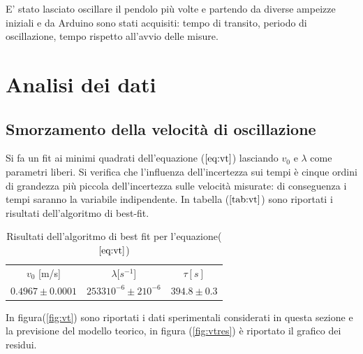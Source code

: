 \documentclass{article}
\begin{document}
E' stato lasciato oscillare il pendolo più volte e partendo da diverse ampeizze iniziali e da Arduino sono stati acquisiti: tempo di transito, periodo di oscillazione, tempo rispetto all'avvio delle misure.





\section{Analisi dei dati}

\subsection{Smorzamento della velocità di oscillazione}
\label{sez:vt}

Si fa un fit ai minimi quadrati dell'equazione ($\ref{eq:vt}$) lasciando $v_0$ e $\lambda$ come parametri liberi.
Si verifica che l'influenza dell'incertezza sui tempi è cinque ordini di grandezza più piccola dell'incertezza sulle velocità misurate: di conseguenza i tempi saranno la variabile indipendente.
In tabella ($\ref{tab:vt}$) sono riportati i risultati dell'algoritmo di best-fit.

\begin{table}[h!]
		\centering
		\begin{tabular}{|ccc|}
			\hline

			$v_0$ [m/s] &  $\lambda [s^{-1}$] & $\tau[s]$ 	\\
			$0.4967 \pm 0.0001$	 & 	$2533 10^{-6} \pm 2 10^{-6}$ 	& $394.8\pm0.3$\\
			\hline
			
		\end{tabular}
		
		\label{tab:vt}	
		\caption{Risultati dell'algoritmo di best fit per l'equazione($\ref{eq:vt}$)} 
\end{table}

In figura(\ref{fig:vt}) sono riportati i dati sperimentali considerati in questa sezione e la previsione del modello teorico, in figura (\ref{fig:vtres}) è riportato il grafico dei residui.
\end{document}
